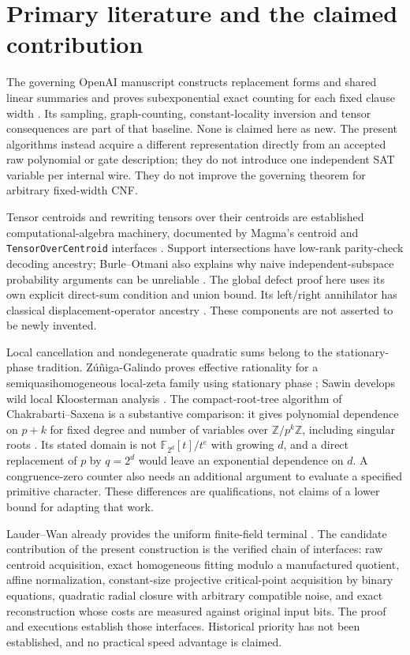 \documentclass[11pt]{article}
\theoremstyle{remark}\newtheorem{remark}[theorem]{Remark}
\newcommand{\F}{\mathbb F}\newcommand{\Tr}{\operatorname{Tr}}
\begin{document}
\section{Primary literature and the claimed contribution}
The governing OpenAI manuscript constructs replacement forms and shared
linear summaries and proves subexponential exact counting for each fixed
clause width \cite{eth}. Its sampling, graph-counting, constant-locality
inversion and tensor consequences are part of that baseline. None is
claimed here as new. The present algorithms instead acquire a different
representation directly from an accepted raw polynomial or gate description;
they do not introduce one independent SAT variable per internal wire.
They do not improve the governing theorem for arbitrary fixed-width CNF.

Tensor centroids and rewriting tensors over their centroids are established
computational-algebra machinery, documented by Magma's centroid and
\texttt{TensorOverCentroid} interfaces \cite{magma}.
Support intersections have low-rank parity-check decoding ancestry;
Burle--Otmani also explains why naive independent-subspace probability
arguments can be unreliable \cite{burleotmani}. The global defect proof
here uses its own explicit direct-sum condition and union bound.
Its left/right annihilator has classical displacement-operator ancestry \cite{displacement}.
These components are not asserted to be newly invented.

Local cancellation and nondegenerate quadratic sums belong to the
stationary-phase tradition. Z\'u\~niga-Galindo proves effective rationality
for a semiquasihomogeneous local-zeta family using stationary phase
\cite{zuniga}; Sawin develops wild local Kloosterman analysis \cite{sawin}.
The compact-root-tree algorithm of Chakrabarti--Saxena is a substantive
comparison: it gives polynomial dependence on $p+k$ for fixed degree and
number of variables over $\mathbb Z/p^k\mathbb Z$, including singular
roots \cite{chakrabarti}. Its stated domain is not
$\F_{2^d}[t]/t^e$ with growing $d$, and a direct replacement of $p$ by
$q=2^d$ would leave an exponential dependence on $d$. A congruence-zero
counter also needs an additional argument to evaluate a specified primitive
character. These differences are qualifications, not claims of a lower
bound for adapting that work.

Lauder--Wan already provides the uniform finite-field terminal
\cite{lauderwan}. The candidate contribution of the present construction
is the verified chain of interfaces: raw centroid acquisition, exact
homogeneous fitting modulo a manufactured quotient, affine normalization,
constant-size projective critical-point acquisition by binary equations,
quadratic radial closure with arbitrary compatible noise, and exact
reconstruction whose costs are measured against original input bits.
The proof and executions establish those interfaces. Historical priority
has not been established, and no practical speed advantage is claimed.
\end{document}
